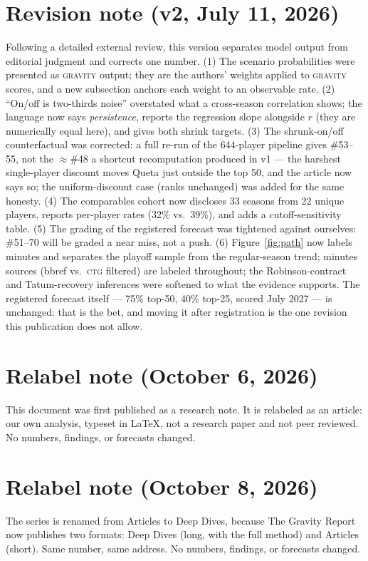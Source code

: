 \documentclass[11pt]{article}
\newcommand{\gravity}{\textsc{gravity}}
\newcommand{\ctg}{\textsc{ctg}}
\begin{document}
\section*{Revision note (v2, July 11, 2026)}
Following a detailed external review, this version separates model output from
editorial judgment and corrects one number. (1) The scenario probabilities were
presented as \gravity{} output; they are the authors' weights applied to \gravity{}
scores, and a new subsection anchors each weight to an observable rate. (2) ``On/off is
two-thirds noise'' overstated what a cross-season correlation shows; the language now
says \emph{persistence}, reports the regression slope alongside $r$ (they are
numerically equal here), and gives both shrink targets. (3) The shrunk-on/off
counterfactual was corrected: a full re-run of the 644-player pipeline gives \#53--55,
not the $\approx$\#48 a shortcut recomputation produced in v1 --- the harshest
single-player discount moves Queta just outside the top 50, and the article now says so;
the uniform-discount case (ranks unchanged) was added for the same honesty. (4) The
comparables cohort now discloses 33 seasons from 22 unique players, reports per-player
rates (32\% vs.\ 39\%), and adds a cutoff-sensitivity table. (5) The grading of the
registered forecast was tightened against ourselves: \#51--70 will be graded a near
miss, not a push. (6) Figure~\ref{fig:path} now labels minutes and separates the
playoff sample from the regular-season trend; minutes sources (bbref vs.\ \ctg{}
filtered) are labeled throughout; the Robinson-contract and Tatum-recovery inferences
were softened to what the evidence supports. The registered forecast itself --- 75\%
top-50, 40\% top-25, scored July 2027 --- is unchanged: that is the bet, and moving it
after registration is the one revision this publication does not allow.

\section*{Relabel note (October 6, 2026)}
This document was first published as a research note. It is relabeled as an article: our own
analysis, typeset in \LaTeX, not a research paper and not peer reviewed. No numbers, findings, or
forecasts changed.

\section*{Relabel note (October 8, 2026)}
The series is renamed from Articles to Deep Dives, because The Gravity Report now publishes two
formats: Deep Dives (long, with the full method) and Articles (short). Same number, same address.
No numbers, findings, or forecasts changed.
\end{document}
